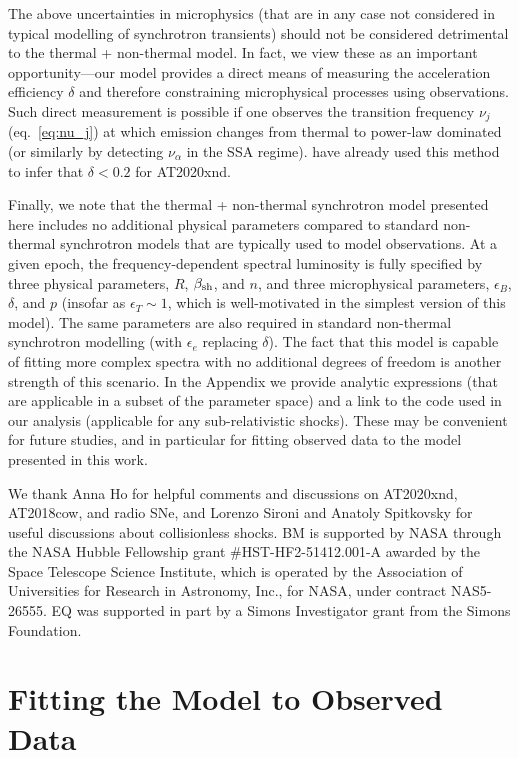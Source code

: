 \documentclass[twocolumn]{aastex63}
\begin{document}
The above uncertainties in microphysics (that are in any case not considered in typical modelling of synchrotron transients) should not be considered detrimental to the thermal + non-thermal model. In fact, we view these as an important opportunity---our model provides a direct means of measuring the acceleration efficiency $\delta$ and therefore constraining microphysical processes using observations. Such direct measurement is possible if one observes the transition frequency $\nu_j$ (eq.~\ref{eq:nu_j}) at which emission changes from thermal to power-law dominated (or similarly by detecting $\nu_\alpha$ in the SSA regime).
\cite{Ho+21b} have already used this method to infer that $\delta < 0.2$ for AT2020xnd.

Finally, we note that the thermal + non-thermal synchrotron model presented here includes no additional physical parameters compared to standard non-thermal synchrotron models that are typically used to model observations. At a given epoch, the frequency-dependent spectral luminosity is fully specified by three physical parameters, $R$, $\beta_{\rm sh}$, and $n$, and three microphysical parameters, $\epsilon_B$, $\delta$, and $p$ (insofar as $\epsilon_T \sim 1$, which is well-motivated in the simplest version of this model). The same parameters are also required in standard non-thermal synchrotron modelling (with $\epsilon_e$ replacing $\delta$). The fact that this model is capable of fitting more complex spectra \citep[see][]{Ho+21b} with no additional degrees of freedom is another strength of this scenario.
In the Appendix we provide analytic expressions (that are applicable in a subset of the parameter space) and a link to the code used in our analysis (applicable for any sub-relativistic shocks). These may be convenient for future studies, and in particular for fitting observed data to the model presented in this work.


\acknowledgements
We thank Anna Ho for helpful comments and discussions on AT2020xnd, AT2018cow, and radio SNe, and Lorenzo Sironi and Anatoly Spitkovsky for useful discussions about collisionless shocks.  BM is supported by NASA through the NASA Hubble Fellowship grant \#HST-HF2-51412.001-A awarded by the Space Telescope Science Institute, which is operated by the Association of Universities for Research in Astronomy, Inc., for NASA, under contract NAS5-26555.   EQ was supported in part by a Simons Investigator grant from the Simons Foundation.


\appendix
\section{Fitting the Model to Observed Data}
\end{document}
